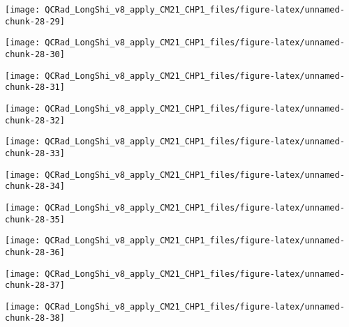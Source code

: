 \documentclass[
  10pt,
  a4paper,oneside]{article}
\begin{document}
\begin{center}\texttt{[image: QCRad\_LongShi\_v8\_apply\_CM21\_CHP1\_files/figure-latex/unnamed-chunk-28-29]} \end{center}

\begin{center}\texttt{[image: QCRad\_LongShi\_v8\_apply\_CM21\_CHP1\_files/figure-latex/unnamed-chunk-28-30]} \end{center}

\begin{center}\texttt{[image: QCRad\_LongShi\_v8\_apply\_CM21\_CHP1\_files/figure-latex/unnamed-chunk-28-31]} \end{center}

\begin{center}\texttt{[image: QCRad\_LongShi\_v8\_apply\_CM21\_CHP1\_files/figure-latex/unnamed-chunk-28-32]} \end{center}

\begin{center}\texttt{[image: QCRad\_LongShi\_v8\_apply\_CM21\_CHP1\_files/figure-latex/unnamed-chunk-28-33]} \end{center}

\begin{center}\texttt{[image: QCRad\_LongShi\_v8\_apply\_CM21\_CHP1\_files/figure-latex/unnamed-chunk-28-34]} \end{center}

\begin{center}\texttt{[image: QCRad\_LongShi\_v8\_apply\_CM21\_CHP1\_files/figure-latex/unnamed-chunk-28-35]} \end{center}

\begin{center}\texttt{[image: QCRad\_LongShi\_v8\_apply\_CM21\_CHP1\_files/figure-latex/unnamed-chunk-28-36]} \end{center}

\begin{center}\texttt{[image: QCRad\_LongShi\_v8\_apply\_CM21\_CHP1\_files/figure-latex/unnamed-chunk-28-37]} \end{center}

\begin{center}\texttt{[image: QCRad\_LongShi\_v8\_apply\_CM21\_CHP1\_files/figure-latex/unnamed-chunk-28-38]} \end{center}
\end{document}
